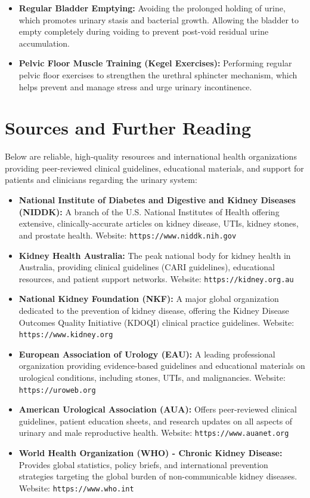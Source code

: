 \begin{itemize}
    \item \textbf{Regular Bladder Emptying:} Avoiding the prolonged holding of urine, which promotes urinary stasis and bacterial growth. Allowing the bladder to empty completely during voiding to prevent post-void residual urine accumulation.
    \item \textbf{Pelvic Floor Muscle Training (Kegel Exercises):} Performing regular pelvic floor exercises to strengthen the urethral sphincter mechanism, which helps prevent and manage stress and urge urinary incontinence.
\end{itemize}

\section*{Sources and Further Reading}
Below are reliable, high-quality resources and international health organizations providing peer-reviewed clinical guidelines, educational materials, and support for patients and clinicians regarding the urinary system:

\begin{itemize}
    \item \textbf{National Institute of Diabetes and Digestive and Kidney Diseases (NIDDK):} A branch of the U.S. National Institutes of Health offering extensive, clinically-accurate articles on kidney disease, UTIs, kidney stones, and prostate health. Website: \texttt{https://www.niddk.nih.gov}
    \item \textbf{Kidney Health Australia:} The peak national body for kidney health in Australia, providing clinical guidelines (CARI guidelines), educational resources, and patient support networks. Website: \texttt{https://kidney.org.au}
    \item \textbf{National Kidney Foundation (NKF):} A major global organization dedicated to the prevention of kidney disease, offering the Kidney Disease Outcomes Quality Initiative (KDOQI) clinical practice guidelines. Website: \texttt{https://www.kidney.org}
    \item \textbf{European Association of Urology (EAU):} A leading professional organization providing evidence-based guidelines and educational materials on urological conditions, including stones, UTIs, and malignancies. Website: \texttt{https://uroweb.org}
    \item \textbf{American Urological Association (AUA):} Offers peer-reviewed clinical guidelines, patient education sheets, and research updates on all aspects of urinary and male reproductive health. Website: \texttt{https://www.auanet.org}
    \item \textbf{World Health Organization (WHO) - Chronic Kidney Disease:} Provides global statistics, policy briefs, and international prevention strategies targeting the global burden of non-communicable kidney diseases. Website: \texttt{https://www.who.int}
\end{itemize}